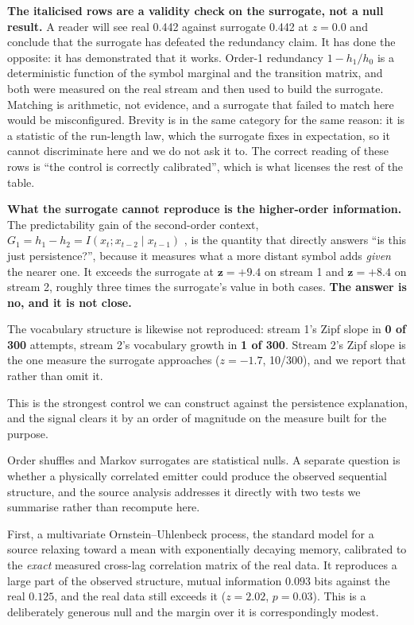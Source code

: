 \documentclass[11pt,a4paper]{article}
\newcommand{\bnum}[1]{\textbf{#1}}
\begin{document}
\textbf{The italicised rows are a validity check on the surrogate, not a null result.} A
reader will see real 0.442 against surrogate 0.442 at $z = 0.0$ and conclude that the
surrogate has defeated the redundancy claim. It has done the opposite: it has demonstrated
that it works. Order-1 redundancy $1 - h_1/h_0$ is a deterministic function of the symbol
marginal and the transition matrix, and both were measured on the real stream and then
used to build the surrogate. Matching is arithmetic, not evidence, and a surrogate that
failed to match here would be misconfigured. Brevity is in the same category for the same
reason: it is a statistic of the run-length law, which the surrogate fixes in
expectation, so it cannot discriminate here and we do not ask it to. The correct
reading of these rows is ``the control is correctly calibrated'', which is what licenses
the rest of the table.

\textbf{What the surrogate cannot reproduce is the higher-order information.} The
predictability gain of the second-order context,
$G_1 = h_1 - h_2 = I(x_t; x_{t-2} \mid x_{t-1})$ \cite{degregorio2026}, is
the quantity that directly answers ``is this just persistence?'', because it measures
what a more distant symbol adds \emph{given} the nearer one. It exceeds the surrogate at
$\mathbf{z = +9.4}$ on stream 1 and $\mathbf{z = +8.4}$ on stream 2, roughly three times
the surrogate's value in both cases. \textbf{The answer is no, and it is not close.}

The vocabulary structure is likewise not reproduced: stream 1's Zipf slope in
\bnum{0 of 300} attempts, stream 2's vocabulary growth in \bnum{1 of 300}. Stream 2's
Zipf slope is the one measure the surrogate approaches ($z = -1.7$, 10/300), and we
report that rather than omit it.

This is the strongest control we can construct against the persistence explanation, and
the signal clears it by an order of magnitude on the measure built for the purpose.

Order shuffles and Markov surrogates are statistical nulls. A separate question is
whether a physically correlated emitter could produce the observed sequential
structure, and the source analysis \cite{meucci2026} addresses it directly with two
tests we summarise rather than recompute here.

First, a multivariate Ornstein--Uhlenbeck process, the standard model for a source
relaxing toward a mean with exponentially decaying memory, calibrated to the
\emph{exact} measured cross-lag correlation matrix of the real data. It reproduces a
large part of the observed structure, mutual information $0.093$ bits against the real
$0.125$, and the real data still exceeds it ($z = 2.02$, $p = 0.03$). This is a
deliberately generous null and the margin over it is correspondingly modest.
\end{document}
